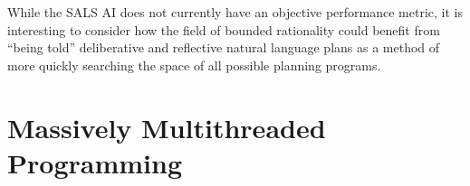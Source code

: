 While the SALS AI does not currently have an objective performance
metric, it is interesting to consider how the field of bounded
rationality could benefit from ``being told'' deliberative and
reflective natural language plans as a method of more quickly
searching the space of all possible planning programs.


\section{Massively Multithreaded Programming}

